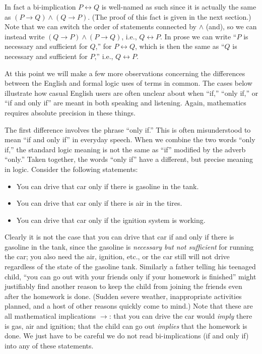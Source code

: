 In fact a bi-implication $P\longleftrightarrow Q$ is well-named as such
since it is actually the same as 
$(P\longrightarrow Q)\wedge(Q\longrightarrow P)$.
(The proof of this fact is given in the next section.)
Note that
we can switch the order of statements connected by $\wedge$ (and),
so we
can instead write 
$(Q\longrightarrow P)\wedge(P\longrightarrow Q)$, i.e.,
$Q\longleftrightarrow P$. 
In prose we can write ``$P$ is necessary and sufficient for $Q$,''
for $P\longleftrightarrow Q$, 
which is then the same as  ``$Q$ is necessary
and sufficient for $P$,'' i.e., $Q\longleftrightarrow P$.

At this point we will make a few more observations concerning
the differences between the
English and formal logic uses of terms in common.
The cases below illustrate how casual English users
are often unclear about when ``if,'' ``only if,'' or
``if and only if'' are meant in both speaking and listening.
Again,  mathematics requires absolute precision
in these things.

The first difference involves the phrase ``only if.''
This is often misunderstood to mean ``if and only if''
in everyday speech. When we combine the two words ``only if,''
the standard logic meaning is not the same as ``if'' modified
by the adverb ``only.''  Taken together, the words ``only if''
have a different, but precise meaning in logic.
Consider the following statements:
\begin{itemize}
\item You can drive that car only if there is gasoline in the tank.
\item You can drive that car only if there is air in the tires.
\item You can drive that car only if the ignition system is working.
\end{itemize}
Clearly it is not the case that you can drive that car if and
only if there is gasoline in the tank, since the gasoline
is {\it necessary but not sufficient} for running the car;
you also  need  the air, ignition, etc., or the car still will not
drive regardless of the state of the gasoline tank.
Similarly a father telling his teenaged child, 
``you can go out with your friends only if your homework 
is finished'' might justifiably find another reason to
keep the child from joining the friends even after
the homework is done. (Sudden severe weather,
inappropriate activities planned, and 
a host of other reasons quickly come to mind.)
Note that these are all mathematical implications $\longrightarrow$:
that you can drive the car would {\it imply} there is
gas, air and ignition; that the child can go out {\it implies}
that the homework is done.  We just have to be careful
we do not read bi-implications (if and only if)
into any of these statements.

